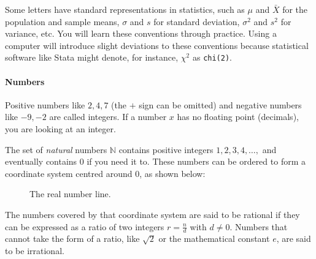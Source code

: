 

Some letters have standard representations in statistics, such as $\mu$ and $\bar X$ for the population and sample means, $\sigma$ and $s$ for standard deviation, $\sigma^2$ and $s^2$ for variance, etc. You will learn these conventions through practice. Using a computer will introduce slight deviations to these conventions because statistical software like Stata might denote, for instance, $\chi^2$ as \texttt{chi(2)}.

%
\paragraph{Numbers}%
%
Positive numbers like $2, 4, 7$ (the $+$ sign can be omitted) and negative numbers like $-9, -2$ are called integers. If a number $x$ has no floating point (decimals), you are looking at an integer.

The set of \emph{natural} numbers $\mathbb{N}$ contains positive integers $1,2,3,4, \ldots, $ and eventually contains $0$ if you need it to. These numbers can be ordered to form a coordinate system centred around $0$, as shown below:

\begin{figure}[h]
  \caption{The real number line.}
\end{figure}

The numbers covered by that coordinate system are said to be rational if they can be expressed as a ratio of two integers $r = \frac{n}{d}$ with $d \neq 0$. Numbers that cannot take the form of a ratio, like $\sqrt{2}$ or the mathematical constant $e$, are said to be irrational.

